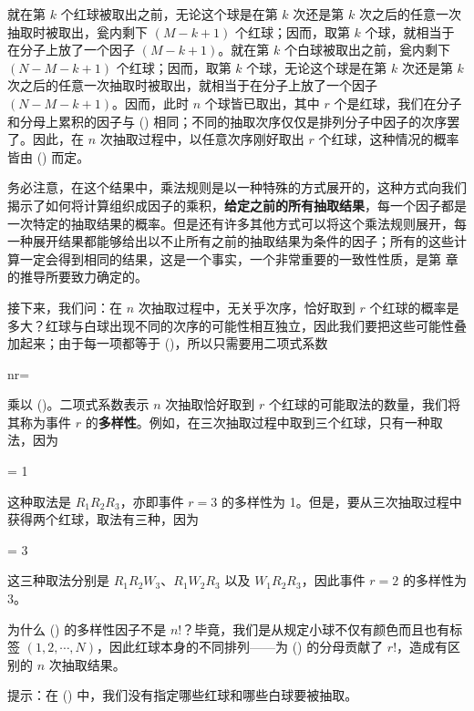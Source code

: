 就在第 $k$ 个红球被取出之前，无论这个球是在第 $k$ 次还是第 $k$ 次之后的任意一次抽取时被取出，瓮内剩下 $(M - k + 1)$ 个红球；因而，取第 $k$ 个球，就相当于在分子上放了一个因子 $(M - k + 1)$。就在第 $k$ 个白球被取出之前，瓮内剩下 $(N - M - k + 1)$ 个红球；因而，取第 $k$ 个球，无论这个球是在第 $k$ 次还是第 $k$ 次之后的任意一次抽取时被取出，就相当于在分子上放了一个因子 $(N - M - k + 1)$。因而，此时 $n$ 个球皆已取出，其中 $r$ 个是红球，我们在分子和分母上累积的因子与 (\in[3-17]) 相同；不同的抽取次序仅仅是排列分子中因子的次序罢了。因此，在 $n$ 次抽取过程中，以任意次序刚好取出 $r$ 个红球，这种情况的概率皆由 (\in[3-15]) 而定。

务必注意，在这个结果中，乘法规则是以一种特殊的方式展开的，这种方式向我们揭示了如何将计算组织成因子的乘积，{\bf 给定之前的所有抽取结果}，每一个因子都是一次特定的抽取结果的概率。但是还有许多其他方式可以将这个乘法规则展开，每一种展开结果都能够给出以不止所有之前的抽取结果为条件的因子；所有的这些计算一定会得到相同的结果，这是一个事实，一个非常重要的一致性性质，是第  章的推导所要致力确定的。

接下来，我们问：在 $n$ 次抽取过程中，无关乎次序，恰好取到 $r$ 个红球的概率是多大？红球与白球出现不同的次序的可能性相互独立，因此我们要把这些可能性叠加起来；由于每一项都等于 (\in[3-15])，所以只需要用二项式系数

\placeformula[3-18]
\startformula
\startpmatrix n\NR r\NR\stoppmatrix = 
\stopformula

乘以 (\in[3-15])。二项式系数表示 $n$ 次抽取恰好取到 $r$ 个红球的可能取法的数量，我们将其称为事件 $r$ 的{\bf 多样性}。例如，在三次抽取过程中取到三个红球，只有一种取法，因为

\placeformula[3-19]
\startformula
{}\NR\stoppmatrix = 1
\stopformula

这种取法是 $R_1R_2R_3$，亦即事件 $r = 3$ 的多样性为 1。但是，要从三次抽取过程中获得两个红球，取法有三种，因为

\placeformula[3-20]
\startformula
{}\NR\stoppmatrix = 3
\stopformula

这三种取法分别是 $R_1R_2W_3$、$R_1W_2R_3$ 以及 $W_1R_2R_3$，因此事件 $r = 2$ 的多样性为 $3$。

\startExercise
为什么 (\in[3-18]) 的多样性因子不是 $n!$？毕竟，我们是从规定小球不仅有颜色而且也有标签 $(1,2,\cdots,N)$，因此红球本身的不同排列——为 (\in[3-18]) 的分母贡献了 $r!$，造成有区别的 $n$ 次抽取结果。

提示：在 (\in[3-15]) 中，我们没有指定哪些红球和哪些白球要被抽取。
\stopExercise

